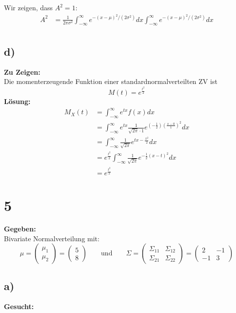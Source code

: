 \documentclass{article}
\begin{document}
Wir zeigen, dass $A^2 = 1$: 
\begin{align*}
    A^2 &= \frac{1}{2\pi \sigma^2} \int_{-\infty}^{\infty} e^{-(x-\mu)^2/(2\sigma^2)} dx \int_{-\infty}^{\infty} e^{-(x-\mu)^2/(2\sigma^2)} dx \\ 
\end{align*}
\subsection*{d)}
\textbf{Zu Zeigen:}\\

Die momenterzeugende Funktion einer standardnormalverteilten ZV ist \[M(t) = e^{\frac{t^2}{2}}\]
\textbf{Lösung:}\\

\begin{align*}
    M_X(t) &= \int_{-\infty}^{\infty} e^{tx}f(x) dx \\
    &= \int_{-\infty}^{\infty} e^{tx} \frac{1}{\sqrt{2\pi} \cdot 1} e^{\left(-\frac{1}{2}\right)\left(\frac{x- 0}{1}\right)^2} dx \\
    &= \int_{-\infty}^{\infty} \frac{1}{\sqrt{2\pi}} e^{tx - \frac{x^2}{2}} dx \\
    &= e^{\frac{t^2}{2}} \int_{-\infty}^{\infty} \frac{1}{\sqrt{2\pi}} e^{-\frac{1}{2}(x-t)^2} dx \\
    &= e^{\frac{t^2}{2}}
\end{align*}
\section*{5}
\textbf{Gegeben:} \\

Bivariate Normalverteilung mit:
\[\mu = \begin{pmatrix}
    \mu_1 \\
    \mu_2
\end{pmatrix} =\begin{pmatrix}
    5 \\
    8
\end{pmatrix} \qquad \text{und} \qquad \Sigma = \begin{pmatrix}
    \Sigma_{11}& \Sigma_{12} \\
    \Sigma_{21}& \Sigma_{22}
\end{pmatrix} = \begin{pmatrix}
    2& -1 \\
    -1& 3
\end{pmatrix}\]
\subsection*{a)}
\textbf{Gesucht:}\\
\end{document}
